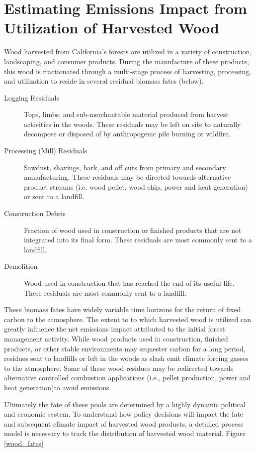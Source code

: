 \documentclass[a4paper]{article}
\begin{document}
\section{Estimating Emissions Impact from Utilization of Harvested Wood}
\label{sec:orgheadline20}
Wood harvested from California's forests are utilized in a variety of construction,
landscaping, and consumer products. During the manufacture of these products, this wood is fractionated 
through a multi-stage process of harvesting, processing, and utilization to reside in several residual biomass fates (below). 

\begin{description}
\item[{Logging Residuals}] Tops, limbs, and sub-merchantable material produced from harvest activities in the woods. These residuals may be left on site to naturally decompose or disposed of by anthropogenic pile burning or wildfire.
\item[{Processing (Mill) Residuals}] Sawdust, shavings, bark, and off cuts from primary and secondary manufacturing. These residuals may be directed towards alternative product streams (i.e. wood pellet, wood chip, power and heat generation) or sent to a landfill.
\item[{Construction Debris}] Fraction of wood used in construction or finished products that are not integrated into its final form. These residuals are most commonly sent to a landfill.
\item[{Demolition}] Wood used in construction that has reached the end of its useful life. These residuals are most commonly sent to a landfill.
\end{description}

These biomass fates have widely variable time horizons for the return of fixed carbon to the atmosphere. The extent to to which harvested wood is utilized can greatly influence the net emissions impact attributed to the initial forest management activity. While wood products used in construction, finished products, or other stable environments may sequester carbon for a long period, residues sent to landfills or left in the woods as slash emit climate forcing gasses to the atmosphere. Some of these wood residues may be redirected towards alternative controlled combustion applications (i.e., pellet production, power and heat generation)to avoid emissions.

Ultimately the fate of these pools are determined by a highly dynamic political and economic system. To understand how policy decisions will impact the fate and subsequent climate impact of harvested wood products, a detailed process model is necessary to track the distribution of harvested wood material. Figure \ref{wood_fates}
\end{document}
